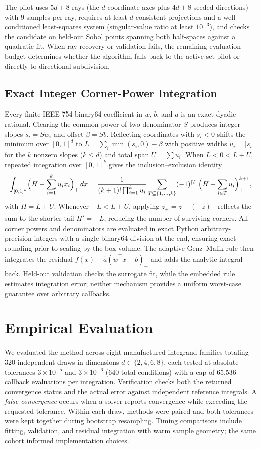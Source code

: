 \documentclass[10pt,letterpaper]{article}
\begin{document}
The pilot uses $5d + 8$ rays (the $d$ coordinate axes plus $4d + 8$ seeded directions) with 9 samples per ray, requires at least $d$ consistent projections and a well-conditioned least-squares system (singular-value ratio at least $10^{-3}$), and checks the candidate on held-out Sobol points spanning both half-spaces against a quadratic fit. When ray recovery or validation fails, the remaining evaluation budget determines whether the algorithm falls back to the active-set pilot or directly to directional subdivision.

\subsection{Exact Integer Corner-Power Integration}

Every finite IEEE-754 binary64 coefficient in $w$, $b$, and $a$ is an exact dyadic rational. Clearing the common power-of-two denominator $S$ produces integer slopes $s_i = S w_i$ and offset $\beta = S b$. Reflecting coordinates with $s_i < 0$ shifts the minimum over $[0,1]^d$ to $L = \sum_i \min(s_i, 0) - \beta$ with positive widths $u_i = |s_i|$ for the $k$ nonzero slopes ($k \leq d$) and total span $U = \sum u_i$. When $L < 0 < L + U$, repeated integration over $[0,1]^k$ gives the inclusion--exclusion identity~\cite{marichal2008}
\[
\int_{[0,1]^k} \Bigl(H - \sum_{i=1}^k u_i x_i\Bigr)_+ \, dx
= \frac{1}{(k+1)!\prod_{i=1}^k u_i} \sum_{T \subseteq \{1,\dots,k\}} (-1)^{|T|} \Bigl(H - \sum_{i \in T} u_i\Bigr)_+^{k+1},
\]
with $H = L + U$. Whenever $-L < L + U$, applying $z_+ = z + (-z)_+$ reflects the sum to the shorter tail $H' = -L$, reducing the number of surviving corners. All corner powers and denominators are evaluated in exact Python arbitrary-precision integers with a single binary64 division at the end, ensuring exact rounding prior to scaling by the box volume. The adaptive Genz--Malik rule then integrates the residual $f(x) - \tilde{a}(\tilde{w}^\top x - \tilde{b})_+$ and adds the analytic integral back. Held-out validation checks the surrogate fit, while the embedded rule estimates integration error; neither mechanism provides a uniform worst-case guarantee over arbitrary callbacks.

\section{Empirical Evaluation}

We evaluated the method across eight manufactured integrand families totaling 320 independent draws in dimensions $d \in \{2, 4, 6, 8\}$, each tested at absolute tolerances $3\times 10^{-5}$ and $3\times 10^{-6}$ (640 total conditions) with a cap of 65,536 callback evaluations per integration. Verification checks both the returned convergence status and the actual error against independent reference integrals. A \emph{false convergence} occurs when a solver reports convergence while exceeding the requested tolerance. Within each draw, methods were paired and both tolerances were kept together during bootstrap resampling. Timing comparisons include fitting, validation, and residual integration with warm sample geometry; the same cohort informed implementation choices.
\end{document}
